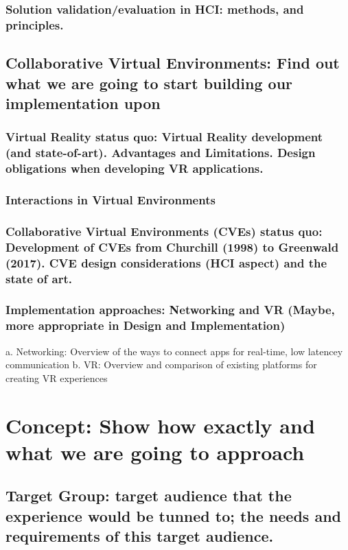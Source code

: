 \subsection{Solution validation/evaluation in HCI: methods, and principles.}

\section{Collaborative Virtual Environments: Find out what we are going to start building our implementation upon}
\subsection{Virtual Reality status quo: Virtual Reality development (and state-of-art). Advantages and Limitations.  Design obligations when developing VR applications. }

\subsection{Interactions in Virtual Environments}
\subsection{Collaborative Virtual Environments (CVEs) status quo: Development of CVEs from Churchill (1998) to Greenwald (2017). CVE design considerations (HCI aspect) and the state of art.}
\subsection{Implementation approaches: Networking and VR (Maybe, more appropriate in Design and Implementation)}
a. Networking: Overview of the ways to connect apps for real-time, low latencey communication
b. VR: Overview and comparison of existing platforms for creating VR experiences


\begin{comment}
Methodology: approach to solving the problem; chosen HCI methodology for the final evaluation - no idea
a. Chosen HCI evaluation methodology
\end{comment}


\chapter{Concept: Show how exactly and what we are going to approach}
\section{Target Group: target audience that the experience would be tunned to; the needs and requirements of this target audience.}

